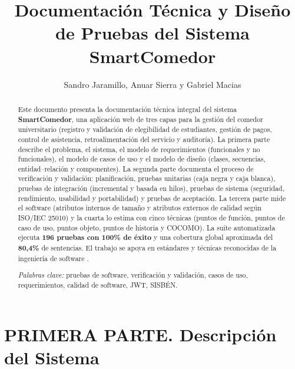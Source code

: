 \documentclass[stu,11pt,floatsintext]{apa7}
\title{Documentación Técnica y Diseño de Pruebas del Sistema SmartComedor}
\author{Sandro Jaramillo, Anuar Sierra y Gabriel Macias}
\affiliation{Universidad Popular del Cesar\\Facultad de Ingenierías y Tecnologías}
\begin{document}
\maketitle

\begin{abstract}
\noindent Este documento presenta la documentación técnica integral del sistema
\textbf{SmartComedor}, una aplicación web de tres capas para la gestión del comedor
universitario (registro y validación de elegibilidad de estudiantes, gestión de pagos,
control de asistencia, retroalimentación del servicio y auditoría). La primera parte
describe el problema, el sistema, el modelo de requerimientos (funcionales y no
funcionales), el modelo de casos de uso y el modelo de diseño (clases, secuencias,
entidad–relación y componentes). La segunda parte documenta el proceso de verificación
y validación: planificación, pruebas unitarias (caja negra y caja blanca), pruebas de
integración (incremental y basada en hilos), pruebas de sistema (seguridad, rendimiento,
usabilidad y portabilidad) y pruebas de aceptación. La tercera parte mide el software
(atributos internos de tamaño y atributos externos de calidad según ISO/IEC 25010) y la
cuarta lo estima con cinco técnicas (puntos de función, puntos de caso de uso, puntos
objeto, puntos de historia y COCOMO). La suite automatizada ejecuta \textbf{196 pruebas
con 100\% de éxito} y una cobertura global aproximada del \textbf{80,4\%} de sentencias.
El trabajo se apoya en estándares y técnicas reconocidas de la ingeniería de software
\parencite{ieee829,iso25010,myers2011,pressman2014}.

\par\vspace{6pt}\noindent\textit{Palabras clave:} pruebas de software, verificación y
validación, casos de uso, requerimientos, calidad de software, JWT, SISBÉN.
\end{abstract}

\tableofcontents
\newpage

\part*{PRIMERA PARTE. Descripción del Sistema}
\end{document}
